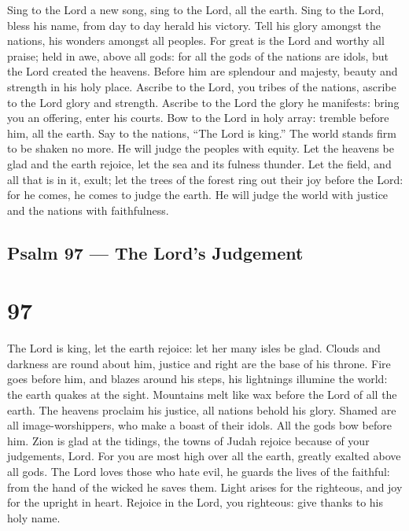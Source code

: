  Sing to the Lord a new song, sing to the Lord, all the
earth.  Sing to the Lord, bless his name, from day to day
herald his victory.  Tell his glory amongst the nations, his
wonders amongst all peoples.  For great is the Lord and
worthy all praise; held in awe, above all gods:  for all the
gods of the nations are idols, but the Lord created the heavens.
 Before him are splendour and majesty, beauty and strength
in his holy place.  Ascribe to the Lord, you tribes of the
nations, ascribe to the Lord glory and strength.  Ascribe to
the Lord the glory he manifests: bring you an offering, enter his
courts.  Bow to the Lord in holy array: tremble before him,
all the earth.  Say to the nations, ``The Lord is king.''
The world stands firm to be shaken no more. He will judge the peoples
with equity.  Let the heavens be glad and the earth
rejoice, let the sea and its fulness thunder.  Let the
field, and all that is in it, exult; let the trees of the forest ring
out their joy  before the Lord: for he comes, he comes to
judge the earth. He will judge the world with justice and the nations
with faithfulness.

\hypertarget{psalm-97-the-lords-judgement}{%
\subsection{Psalm 97 --- The Lord's
Judgement}\label{psalm-97-the-lords-judgement}}

\hypertarget{section-96}{%
\section{97}\label{section-96}}

 The Lord is king, let the earth rejoice: let her many isles
be glad.  Clouds and darkness are round about him, justice
and right are the base of his throne.  Fire goes before him,
and blazes around his steps,  his lightnings illumine the
world: the earth quakes at the sight.  Mountains melt like
wax before the Lord of all the earth.  The heavens proclaim
his justice, all nations behold his glory.  Shamed are all
image-worshippers, who make a boast of their idols. All the gods bow
before him.  Zion is glad at the tidings, the towns of Judah
rejoice because of your judgements, Lord.  For you are most
high over all the earth, greatly exalted above all gods. 
The Lord loves those who hate evil, he guards the lives of the faithful:
from the hand of the wicked he saves them.  Light arises
for the righteous, and joy for the upright in heart. 
Rejoice in the Lord, you righteous: give thanks to his holy name.


